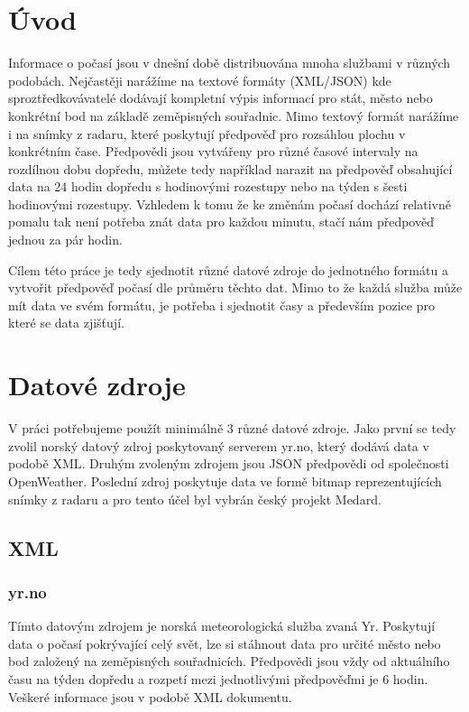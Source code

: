 \documentclass[czech,bachelor,dept460,male,csharp,cpdeclaration]{diploma}
\begin{document}
	
	\MakeTitlePages
	
	\section{Úvod}	
	
	Informace o počasí jsou v dnešní době distribuována mnoha službami v různých podobách. Nejčastěji narážíme na textové formáty (XML/JSON) kde sproztředkovávatelé dodávají kompletní výpis informací pro stát, město nebo konkrétní bod na základě zeměpisných souřadnic. Mimo textový formát narážíme i na snímky z radaru, které poskytují předpověď pro rozsáhlou plochu v konkrétním čase. Předpovědi jsou vytvářeny pro různé časové intervaly na rozdílnou dobu dopředu, můžete tedy například narazit na předpověď obsahující data na 24 hodin dopředu s hodinovými rozestupy nebo na týden s šesti hodinovými rozestupy. Vzhledem k tomu že ke změnám počasí dochází relativně pomalu tak není potřeba znát data pro každou minutu, stačí nám předpověď jednou za pár hodin.
	
	Cílem této práce je tedy sjednotit různé datové zdroje do jednotného formátu a vytvořit předpověď počasí dle průměru těchto dat. Mimo to že každá služba může mít data ve svém formátu, je potřeba i sjednotit časy a především pozice pro které se data zjišťují. 
	
	\section{Datové zdroje}
	
	V práci potřebujeme použít minimálně 3 různé datové zdroje. Jako první se tedy zvolil norský datový zdroj poskytovaný serverem yr.no, který dodává data v podobě XML. Druhým zvoleným zdrojem jsou JSON předpovědi od společnosti OpenWeather. Poslední zdroj poskytuje data ve formě bitmap reprezentujících snímky z radaru a pro tento účel byl vybrán český projekt Medard.
	
	\subsection{XML}
	\subsubsection{yr.no}
	
	Tímto datovým zdrojem je norská meteorologická služba zvaná Yr. Poskytují data o počasí pokrývající celý svět, lze si stáhnout data pro určité město nebo bod založený na zeměpisných souřadnicích. Předpovědi jsou vždy od aktuálního času na týden dopředu a rozpetí mezi jednotlivými předpověďmi je 6 hodin. Veškeré informace jsou v podobě XML dokumentu.
	
\end{document}
